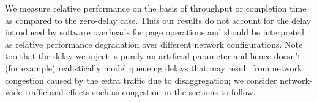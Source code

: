 We measure relative performance on the basis of throughput or completion time as compared to the zero-delay case. Thus our results do not account for the delay introduced by  software overheads for page operations 
and should be interpreted as relative performance degradation over different network configurations.%
Note too that the delay we inject is purely an artificial parameter and hence doesn't (for example) realistically model queueing delays that may result from network congestion caused by the extra traffic due to disaggregation; we consider network-wide traffic and effects such as congestion in the sections to follow.








